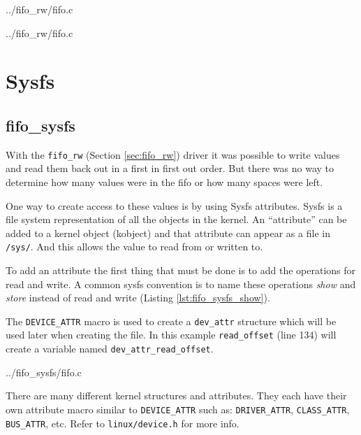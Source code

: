 \documentclass{article}
\begin{document}

	{../fifo_rw/fifo.c}


	{../fifo_rw/fifo.c}

\clearpage
\section{Sysfs}


\subsection{fifo\_sysfs}

With the \verb+fifo_rw+ (Section \ref{sec:fifo_rw}) driver it was possible
to write values and read them back out in a first in first out order.
But there was no way to determine how many values were in the fifo or
how many spaces were left.

One way to create access to these values is by using Sysfs attributes.
Sysfs is a file system representation of all the objects in the kernel.
An ``attribute'' can be added to a kernel object (kobject) and
that attribute can appear as a file in \verb+/sys/+.
And this allows the value to read from or written to.

To add an attribute the first thing that must be done is to
add the operations for read and write.
A common sysfs convention is to name these operations \emph{show}
and \emph{store} instead of read and write (Listing \ref{lst:fifo_sysfs_show}).

The \verb+DEVICE_ATTR+ macro is used to create a \verb+dev_attr+ structure
which will be used later when creating the file.
In this example \verb+read_offset+ (line 134) will create a variable named
\verb+dev_attr_read_offset+.


	{../fifo_sysfs/fifo.c}

There are many different kernel structures and attributes.
They each have their own attribute macro similar to
\verb+DEVICE_ATTR+ such as: \verb+DRIVER_ATTR+, \verb+CLASS_ATTR+,
\verb+BUS_ATTR+, etc.
Refer to \verb+linux/device.h+ for more info.
\end{document}
